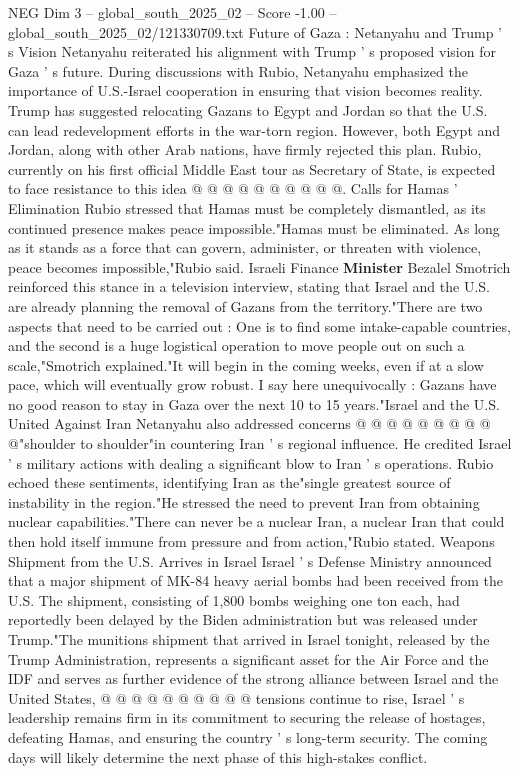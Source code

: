 \begin{textsample}{NEG Dim 3 – global\_south\_2025\_02 – Score -1.00 – global\_south\_2025\_02/121330709.txt}
Future of Gaza : Netanyahu and Trump ' s Vision Netanyahu reiterated his alignment with Trump ' s proposed vision for Gaza ' s future.
During discussions with Rubio, Netanyahu emphasized the importance of U.S.-Israel cooperation in ensuring that vision becomes reality.
Trump has suggested relocating Gazans to Egypt and Jordan so that the U.S. can lead redevelopment efforts in the war-torn region.
However, both Egypt and Jordan, along with other Arab nations, have firmly rejected this plan.
Rubio, currently on his first official Middle East tour as Secretary of State, is expected to face resistance to this idea @ @ @ @ @ @ @ @ @ @.
Calls for Hamas ' Elimination Rubio stressed that Hamas must be completely dismantled, as its continued presence makes peace impossible."Hamas must be eliminated.
As long as it stands as a force that can govern, administer, or threaten with violence, peace becomes impossible,"Rubio said.
Israeli Finance \textbf{Minister} Bezalel Smotrich reinforced this stance in a television interview, stating that Israel and the U.S. are already planning the removal of Gazans from the territory."There are two aspects that need to be carried out : One is to find some intake-capable countries, and the second is a huge logistical operation to move people out on such a scale,"Smotrich explained."It will begin in the coming weeks, even if at a slow pace, which will eventually grow robust.
I say here unequivocally : Gazans have no good reason to stay in Gaza over the next 10 to 15 years."Israel and the U.S.
United Against Iran Netanyahu also addressed concerns @ @ @ @ @ @ @ @ @ @"shoulder to shoulder"in countering Iran ' s regional influence.
He credited Israel ' s military actions with dealing a significant blow to Iran ' s operations.
Rubio echoed these sentiments, identifying Iran as the"single greatest source of instability in the region."He stressed the need to prevent Iran from obtaining nuclear capabilities."There can never be a nuclear Iran, a nuclear Iran that could then hold itself immune from pressure and from action,"Rubio stated.
Weapons Shipment from the U.S.
Arrives in Israel Israel ' s Defense Ministry announced that a major shipment of MK-84 heavy aerial bombs had been received from the U.S.
The shipment, consisting of 1,800 bombs weighing one ton each, had reportedly been delayed by the Biden administration but was released under Trump."The munitions shipment that arrived in Israel tonight, released by the Trump Administration, represents a significant asset for the Air Force and the IDF and serves as further evidence of the strong alliance between Israel and the United States, @ @ @ @ @ @ @ @ @ @ tensions continue to rise, Israel ' s leadership remains firm in its commitment to securing the release of hostages, defeating Hamas, and ensuring the country ' s long-term security.
The coming days will likely determine the next phase of this high-stakes conflict.

\end{textsample}
